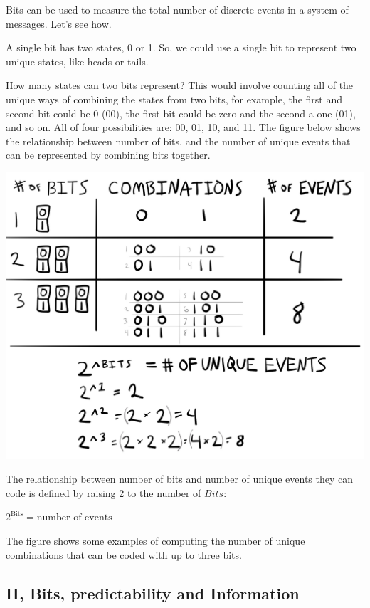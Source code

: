 \documentclass[
  oneside,
  12pt]{crumpbook}
\begin{document}
Bits can be used to measure the total number of discrete events in a system of messages. Let's see how.

A single bit has two states, 0 or 1. So, we could use a single bit to represent two unique states, like heads or tails.

How many states can two bits represent? This would involve counting all of the unique ways of combining the states from two bits, for example, the first and second bit could be 0 (00), the first bit could be zero and the second a one (01), and so on. All of four possibilities are: 00, 01, 10, and 11. The figure below shows the relationship between number of bits, and the number of unique events that can be represented by combining bits together.

\begin{center}\includegraphics[width=1\linewidth]{imgs/Shannon_bits} \end{center}

The relationship between number of bits and number of unique events they can code is defined by raising 2 to the number of \(Bits\):

\(2^\text{Bits} = \text{number of events}\)

The figure shows some examples of computing the number of unique combinations that can be coded with up to three bits.

\hypertarget{h-bits-predictability-and-information}{%
\subsection{H, Bits, predictability and Information}\label{h-bits-predictability-and-information}}
\end{document}

